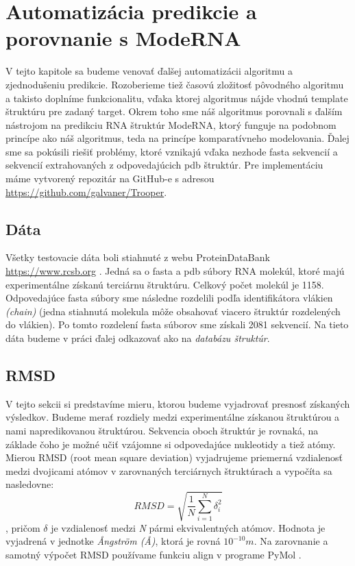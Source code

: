 \chapter{Automatizácia predikcie a porovnanie s ModeRNA}

V tejto kapitole sa budeme venovať ďalšej automatizácii algoritmu a zjednodušeniu predikcie. Rozoberieme tiež časovú zložitosť pôvodného algoritmu a takisto doplníme funkcionalitu, vďaka ktorej algoritmus nájde vhodnú template štruktúru pre zadaný target. Okrem toho sme náš algoritmus porovnali s ďalším nástrojom na predikciu RNA štruktúr ModeRNA, ktorý funguje na podobnom princípe ako náš algoritmus, teda na princípe komparatívneho modelovania. Ďalej sme sa pokúsili riešiť problémy, ktoré vznikajú vďaka nezhode fasta sekvencií a sekvencií extrahovaných z odpovedajúcich pdb štruktúr. Pre implementáciu máme vytvorený repozitár na GitHub-e s adresou \url{https://github.com/galvaner/Trooper}.

\section{Dáta}
Všetky testovacie dáta boli stiahnuté z webu ProteinDataBank \url{https://www.rcsb.org} \cite{PDB00}. Jedná sa o fasta a pdb súbory RNA molekúl, ktoré majú experimentálne získanú terciárnu štruktúru. Celkový počet molekúl je 1158. Odpovedajúce fasta súbory sme následne rozdelili podľa identifikátora vlákien \textit{(chain)} (jedna stiahnutá molekula môže obsahovať viacero štruktúr rozdelených do vlákien). Po tomto rozdelení fasta súborov sme získali 2081 sekvencií. Na tieto dáta budeme v práci ďalej odkazovať ako na \textit{databázu štruktúr}.


\section{RMSD}
V tejto sekcii si predstavíme mieru, ktorou budeme vyjadrovať presnosť získaných výsledkov. Budeme merať rozdiely medzi experimentálne získanou štruktúrou a nami napredikovanou štruktúrou. Sekvencia oboch štruktúr je rovnaká, na základe čoho je možné učiť vzájomne si odpovedajúce nukleotidy a tiež atómy. Mierou RMSD (root mean square deviation) vyjadrujeme priemerná vzdialenosť medzi dvojicami atómov v zarovnaných terciárnych štruktúrach a vypočíta sa nasledovne:
$$RMSD = \sqrt{ \frac{1}{N} \sum_{i=1}^{N} \delta_i ^ {2}}$$, pričom $\delta$ je vzdialenosť medzi \textit{N} pármi ekvivalentných atómov. Hodnota je vyjadrená  v  jednotke \textit{Ångström (Å)}, ktorá je rovná  $10^{-10}m$. Na zarovnanie a samotný výpočet RMSD používame funkciu align v programe PyMol \cite{PyMOL}.



